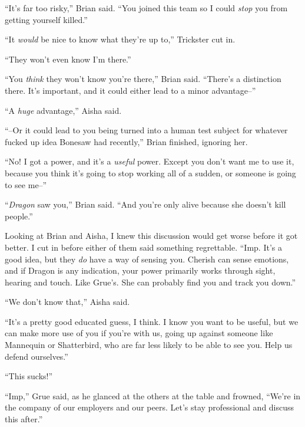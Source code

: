 ``It's far too risky,'' Brian said.  ``You joined this team so I could \emph{stop} you from getting yourself killed.''



``It \emph{would} be nice to know what they're up to,'' Trickster cut in.



``They won't even know I'm there.''



``You \emph{think} they won't know you're there,'' Brian said.  ``There's a distinction there.  It's important, and it could either lead to a minor advantage--''



``A \emph{huge} advantage,'' Aisha said.



``--Or it could lead to you being turned into a human test subject for whatever fucked up idea Bonesaw had recently,'' Brian finished, ignoring her.



``No!  I got a power, and it's a \emph{useful} power.  Except you don't want me to use it, because you think it's going to stop working all of a sudden, or someone is going to see me--''



``\emph{Dragon} saw you,'' Brian said.  ``And you're only alive because she doesn't kill people.''



Looking at Brian and Aisha, I knew this discussion would get worse before it got better.  I cut in before either of them said something regrettable.  ``Imp.  It's a good idea, but they \emph{do} have a way of sensing you.  Cherish can sense emotions, and if Dragon is any indication, your power primarily works through sight, hearing and touch.  Like Grue's.  She can probably find you and track you down.''



``We don't know that,'' Aisha said.



``It's a pretty good educated guess, I think.  I know you want to be useful, but we can make more use of you if you're with us, going up against someone like Mannequin or Shatterbird, who are far less likely to be able to see you.  Help us defend ourselves.''



``This sucks!''



``Imp,'' Grue said, as he glanced at the others at the table and frowned, ``We're in the company of our employers and our peers.  Let's stay professional and discuss this after.''



